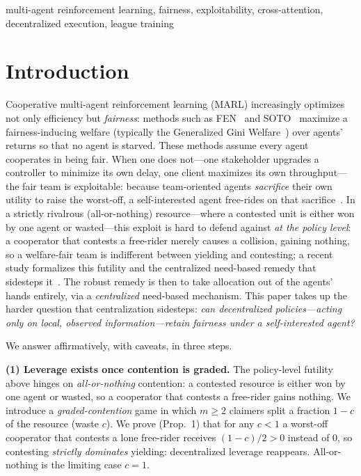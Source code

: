 \documentclass[conference, a4paper]{IEEEtran}
\begin{document}
\renewcommand{\IEEEkeywordsname}{Keywords}
\begin{IEEEkeywords}
multi-agent reinforcement learning, fairness, exploitability, cross-attention,
decentralized execution, league training
\end{IEEEkeywords}

\section{Introduction}
Cooperative multi-agent reinforcement learning (MARL) increasingly optimizes not
only efficiency but \emph{fairness}: methods such as FEN~\cite{jiang2019fen} and
SOTO~\cite{zimmer2021soto} maximize a fairness-inducing welfare (typically the
Generalized Gini Welfare~\cite{siddique2020ggf}) over agents' returns so that no
agent is starved. These methods assume every agent cooperates in being fair. When
one does not---one stakeholder upgrades a controller to minimize its own delay, one
client maximizes its own throughput---the fair team is exploitable: because
team-oriented agents \emph{sacrifice} their own utility to raise the worst-off, a
self-interested agent free-rides on that sacrifice~\cite{ivanov2023mediated}. In a
strictly rivalrous (all-or-nothing) resource---where a contested unit is either won
by one agent or wasted---this exploit is hard to defend against \emph{at the policy
level}: a cooperator that contests a free-rider merely causes a collision, gaining
nothing, so a welfare-fair team is indifferent between yielding and contesting; a
recent study formalizes this futility and the centralized need-based remedy that
sidesteps it~\cite{savci2026exploit}. The robust remedy is then to take allocation
out of the agents' hands entirely, via a \emph{centralized} need-based mechanism.
This paper takes up the harder question
that centralization sidesteps: \emph{can decentralized policies---acting only on
local, observed information---retain fairness under a self-interested agent?}

We answer affirmatively, with caveats, in three steps.

\textbf{(1) Leverage exists once contention is graded.} The policy-level futility
above hinges on \emph{all-or-nothing} contention: a contested resource is either
won by one agent or wasted, so a cooperator that contests a free-rider gains
nothing. We introduce a \emph{graded-contention} game in which $m\ge 2$ claimers
split a fraction $1{-}c$ of the resource (waste $c$). We prove (Prop.~1) that for
any $c<1$ a worst-off cooperator that contests a lone free-rider receives
$(1{-}c)/2>0$ instead of $0$, so contesting \emph{strictly dominates} yielding:
decentralized leverage reappears. All-or-nothing is the limiting case $c{=}1$.
\end{document}
